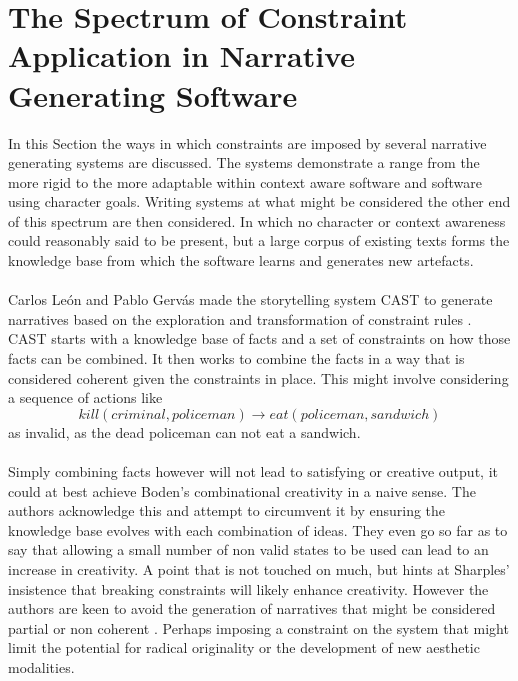 \documentclass[letterpaper]{article}
\begin{document}
\section{The Spectrum of Constraint Application in Narrative Generating Software} \label{sec:spectrum}
In this Section the ways in which constraints are imposed by several narrative generating systems are discussed. The systems demonstrate a range from the more rigid to the more adaptable within context aware software and software using character goals. Writing systems at what might be considered the other end of this spectrum are then considered. In which no character or context awareness could reasonably said to be present, but a large corpus of existing texts forms the knowledge base from which the software learns and generates new artefacts.\\
\\Carlos Le\'on and Pablo Gerv\'as made the storytelling system CAST to generate narratives based on the exploration and transformation of constraint rules . CAST starts with a knowledge base of facts and a set of constraints on how those facts can be combined. It then works to combine the facts in a way that is considered coherent given the constraints in place. This might involve considering a sequence of actions like
\begin{equation}
kill(criminal, policeman) \rightarrow eat(policeman, sandwich) 
\end{equation}
as invalid, as the dead policeman can not eat a sandwich. \\
\\Simply combining facts however will not lead to satisfying or creative output, it could at best achieve Boden's combinational creativity in a naive sense. The authors acknowledge this and attempt to circumvent it by ensuring the knowledge base evolves with each combination of ideas. They even go so far as to say that allowing a small number of non valid states to be used can lead to an increase in creativity. A point that is not touched on much, but hints at Sharples' insistence that breaking constraints will likely enhance creativity. However the authors are keen to avoid the generation of narratives that might be considered partial or non coherent . Perhaps imposing a constraint on the system that might limit the potential for radical originality or the development of new aesthetic modalities.\\
\end{document}
